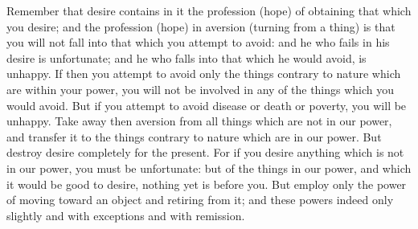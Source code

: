 Remember that  desire contains in  it the  profession (hope) of  obtaining that
which you desire; and the profession  (hope) in aversion (turning from a thing)
is that  you will not  fall into that  which you attempt  to avoid: and  he who
fails in his desire  is unfortunate; and he who falls into  that which he would
avoid, is  unhappy. If then  you attempt to avoid  only the things  contrary to
nature which  are within your  power, you  will not be  involved in any  of the
things which you would  avoid. But if you attempt to avoid  disease or death or
poverty, you will be unhappy. Take away then aversion from all things which are
not in our power, and transfer it to the things contrary to nature which are in
our power.  But destroy desire  completely for the  present. For if  you desire
anything which is not in our power,  you must be unfortunate: but of the things
in our power, and which it would be  good to desire, nothing yet is before you.
But employ only the power of moving  toward an object and retiring from it; and
these powers indeed only slightly and with exceptions and with remission.
